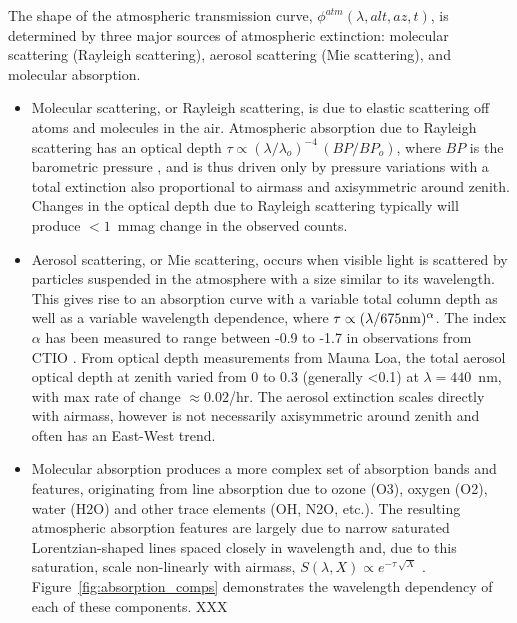 \documentclass[12pt,preprint]{aastex}
\begin{document}
The shape of the atmospheric transmission curve, $\phi^{atm}(\lambda,
alt, az, t)$, is determined by three major sources of atmospheric
extinction: molecular scattering (Rayleigh scattering), aerosol
scattering (Mie scattering), and molecular absorption. 
\begin{itemize}
\item{Molecular
scattering, or Rayleigh scattering, is due to elastic scattering off
atoms and molecules in the air. Atmospheric absorption due to Rayleigh
scattering has an optical depth $\tau \propto (\lambda/
\lambda_o)^{-4}\, (BP/BP_o)$, where $BP$ is the barometric pressure
\citep{Hansen1974}, and is thus driven only by pressure variations
with a total extinction also proportional to airmass and axisymmetric
around zenith. Changes in the optical depth due to Rayleigh scattering
typically will produce $<1$~mmag change in the observed counts.}
\item{Aerosol scattering, or Mie scattering, occurs when visible light
is scattered by particles suspended in the atmosphere with a size
similar to its wavelength.  This gives rise to an absorption curve
with a variable total column depth as well as a variable wavelength
dependence, where $\tau \propto (\lambda/675 \rm{nm})^{\alpha}$. The
index $\alpha$ has been measured to range between -0.9 to -1.7 in
observations from CTIO \citep{Burke2010b}.  From \citep{Stubbs2007b}
optical depth measurements from Mauna Loa, the total aerosol optical
depth at zenith varied from 0 to 0.3 (generally <0.1) at
$\lambda=440$~nm, with max rate of change $\approx0.02$/hr. The
aerosol extinction scales directly with airmass, however is not
necessarily axisymmetric around zenith and often has an East-West
trend. }
\item{Molecular absorption produces a more complex
set of absorption bands and features, originating from line absorption
due to ozone (O3), oxygen (O2), water (H2O) and other trace elements
(OH, N2O, etc.). The resulting atmospheric absorption features are largely due
to narrow saturated Lorentzian-shaped lines spaced closely in
wavelength and, due to this saturation, scale non-linearly with airmass,
$S(\lambda, X) \propto e^{-\tau\,\sqrt X}$
\citep{Stubbs2007b}. Figure~\ref{fig:absorption_comps} demonstrates the
wavelength dependency of each of these components. 
XXX
}
\end{itemize}
\end{document}
